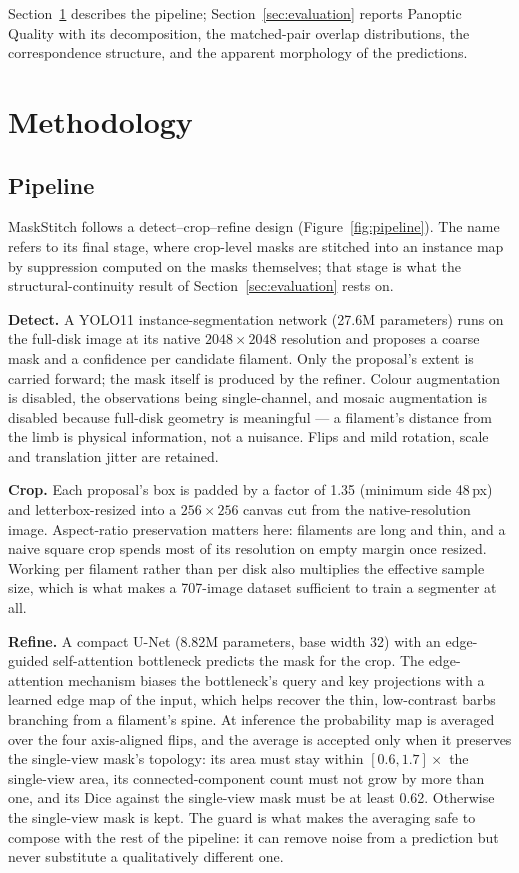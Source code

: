 \documentclass[sigconf]{acmart}
\begin{document}
    Section~\ref{sec:methodology} describes the pipeline; Section~\ref{sec:evaluation} reports Panoptic Quality with its decomposition, the matched-pair overlap distributions, the correspondence structure, and the apparent morphology of the predictions.

\section{Methodology}\label{sec:methodology}

\subsection{Pipeline}
    MaskStitch follows a detect--crop--refine design (Figure~\ref{fig:pipeline}). The name refers to its final stage, where crop-level masks are stitched into an instance map by suppression computed on the masks themselves; that stage is what the structural-continuity result of Section~\ref{sec:evaluation} rests on.

    \textbf{Detect.} A YOLO11 instance-segmentation network \cite{jocher2023yolo} (27.6M parameters) runs on the full-disk image at its native $2048\times2048$ resolution and proposes a coarse mask and a confidence per candidate filament. Only the proposal's extent is carried forward; the mask itself is produced by the refiner. Colour augmentation is disabled, the observations being single-channel, and mosaic augmentation is disabled because full-disk geometry is meaningful --- a filament's distance from the limb is physical information, not a nuisance. Flips and mild rotation, scale and translation jitter are retained.

    \textbf{Crop.} Each proposal's box is padded by a factor of 1.35 (minimum side 48\,px) and letterbox-resized into a $256\times256$ canvas cut from the native-resolution image. Aspect-ratio preservation matters here: filaments are long and thin, and a naive square crop spends most of its resolution on empty margin once resized. Working per filament rather than per disk also multiplies the effective sample size, which is what makes a 707-image dataset sufficient to train a segmenter at all.

    \textbf{Refine.} A compact U-Net \cite{ronneberger2015unet} (8.82M parameters, base width 32) with an edge-guided self-attention bottleneck \cite{solomon2025edgeattnet} predicts the mask for the crop. The edge-attention mechanism biases the bottleneck's query and key projections with a learned edge map of the input, which helps recover the thin, low-contrast barbs branching from a filament's spine. At inference the probability map is averaged over the four axis-aligned flips, and the average is accepted only when it preserves the single-view mask's topology: its area must stay within $[0.6, 1.7]\times$ the single-view area, its connected-component count must not grow by more than one, and its Dice against the single-view mask must be at least 0.62. Otherwise the single-view mask is kept. The guard is what makes the averaging safe to compose with the rest of the pipeline: it can remove noise from a prediction but never substitute a qualitatively different one.
\end{document}
